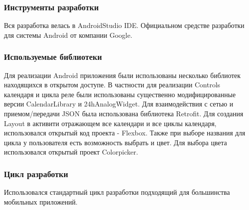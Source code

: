 \subsubsection{Инструменты разработки}
Вся разработка велась в AndroidStudio IDE. Официальном средстве разработки для системы Android от компании Google.

\subsubsection{Используемые библиотеки}
Для реализации Android приложения были использованы несколько библиотек находящихся в открытом доступе. В частности для реализации Controls календаря и цикла реле были использованы существенно модифицированные версии CalendarLibrary и 24hAnalogWidget. Для взаимодействия с сетью и приемом/передачи JSON была использована библиотека Retrofit. Для создания Layout в активити отражающем все календари и все циклы календаря, использовался открытый код проекта - Flexbox. Также при выборе названия для цикла у пользователя есть возможность выбрать и цвет. Для выбора цвета использовался открытый проект Colorpicker.

\subsubsection{Цикл разработки}
Использовался стандартный цикл разработки подходящий для большинства мобильных приложений.
